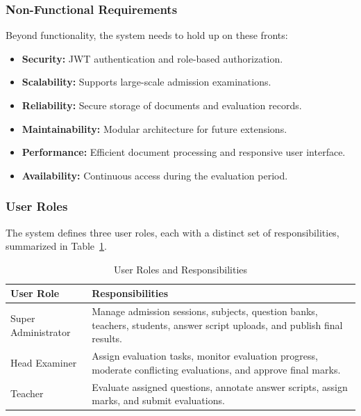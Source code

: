 \subsubsection{Non-Functional Requirements}

Beyond functionality, the system needs to hold up on these fronts:

\begin{itemize}
    \item \textbf{Security:} JWT authentication and role-based authorization.
    \item \textbf{Scalability:} Supports large-scale admission examinations.
    \item \textbf{Reliability:} Secure storage of documents and evaluation records.
    \item \textbf{Maintainability:} Modular architecture for future extensions.
    \item \textbf{Performance:} Efficient document processing and responsive user interface.
    \item \textbf{Availability:} Continuous access during the evaluation period.
\end{itemize}

\subsubsection{User Roles}

The system defines three user roles, each with a distinct set of responsibilities, summarized in Table~\ref{tab:user_roles}.

\begin{table}[ht]
\centering
\caption{User Roles and Responsibilities}
\label{tab:user_roles}
\begin{tabular}{|p{3.5cm}|p{10cm}|}
\hline
\textbf{User Role} & \textbf{Responsibilities} \\
\hline
Super Administrator &
Manage admission sessions, subjects, question banks, teachers, students, answer script uploads, and publish final results. \\
\hline
Head Examiner &
Assign evaluation tasks, monitor evaluation progress, moderate conflicting evaluations, and approve final marks. \\
\hline
Teacher &
Evaluate assigned questions, annotate answer scripts, assign marks, and submit evaluations. \\
\hline
\end{tabular}
\end{table}


